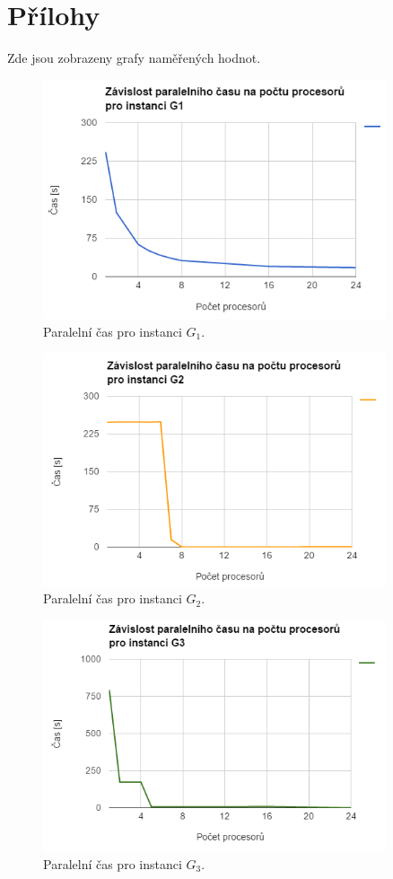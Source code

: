 \documentclass[12pt]{article}
\theoremstyle{definition}
\begin{document}
\section*{Přílohy}
Zde jsou zobrazeny grafy naměřených hodnot.
\begin{figure}[ht]
	\centering
	\includegraphics[width=0.90\textwidth]{obr/time1.png}
	\caption{Paralelní čas pro instanci $G_1$.}
	\label{imgTime1}
\end{figure}
\begin{figure}[ht]
	\centering
	\includegraphics[width=0.90\textwidth]{obr/time2.png}
	\caption{Paralelní čas pro instanci $G_2$.}
	\label{imgTime2}
\end{figure}
\begin{figure}[ht]
	\centering
	\includegraphics[width=0.90\textwidth]{obr/time3.png}
	\caption{Paralelní čas pro instanci $G_3$.}
	\label{imgTime3}
\end{figure}
\end{document}
